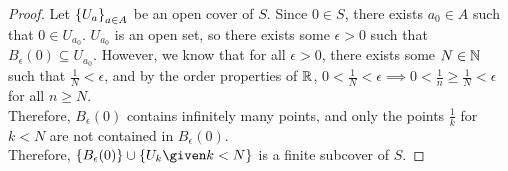 \begin{problem}
\begin{enumroman}
\begin{answer}
\begin{claim}
\begin{proof}
            Let $\left\{U_a\right\}_{a \in A}$ be an open cover of $S$.
            Since $0 \in S$, there exists $a_0 \in A$ such that $0 \in U_{a_0}$.
            $U_{a_0}$ is an open set, so there exists some
            $\epsilon > 0$ such that $B_\epsilon(0) \subseteq U_{a_0}$.
            However, we know that for all $\epsilon > 0$,
            there exists some $N \in \mathbb{N}$ such that $\frac{1}{N} < \epsilon$,
            and by the order properties of $\mathbb{R}$,
            $0 < \frac{1}{N} < \epsilon \implies 0 < \frac{1}{n} \geq \frac{1}{N} < \epsilon$
            for all $n \geq N$. \\
            Therefore, $B_\epsilon(0)$ contains infinitely many points,
            and only the points $\frac{1}{k}$ for $k < N$ are not contained in $B_\epsilon(0)$. \\
            Therefore, $\set{B_\epsilon(0)} \cup \set{U_k \given k < N}$
            is a finite subcover of $S$.
          \end{proof}
        \end{claim}
      \end{answer}
  \end{enumroman}
\end{problem}
